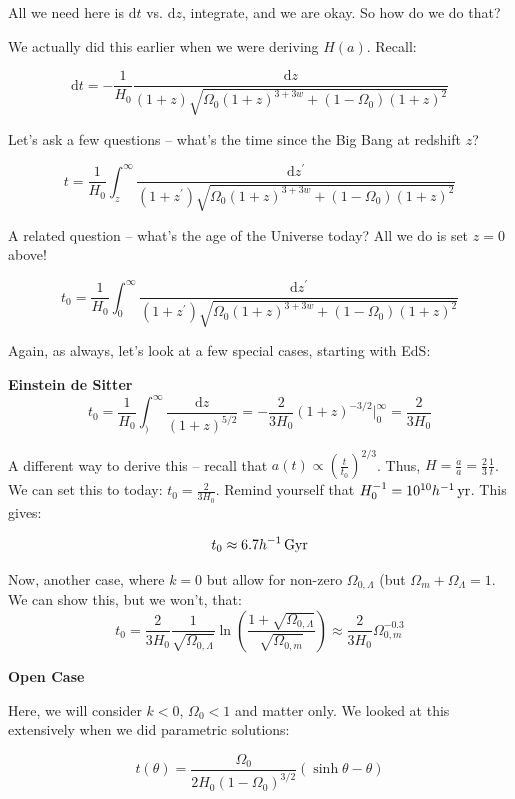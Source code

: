 \documentclass{article}
\newcommand{\unit}[1]{{\,\rm #1}}
\newcommand{\be}{\begin{equation}}
\newcommand{\ee}{\end{equation}}
\newcommand{\Gyr}{\unit{Gyr}}
\newcommand{\yr}{\unit{yr}}
\begin{document}
All we need here is $\mathrm{d}t$ vs. $\mathrm{d}z$, integrate, and we are okay. So how do we do that?

We actually did this earlier when we were deriving $H(a)$. Recall:

\be
\mathrm{d}t = -\frac{1}{H_0} \frac{\mathrm{d}z}{\left(1+z\right) \sqrt{\Omega_0 \left(1+z\right)^{3+3w} + (1-\Omega_0)\left(1+z\right)^2}}
\ee

Let's ask a few questions -- what's the time since the Big Bang at redshift $z$?

\be
t = \frac{1}{H_0}\int_{z}^{\infty} \frac{\mathrm{d}z^\prime}{\left(1+z^\prime\right)\sqrt{\Omega_0 \left(1+z\right)^{3+3w} + (1-\Omega_0)\left(1+z\right)^2}}
\ee

A related question -- what's the age of the Universe today? All we do is set $z = 0$ above! 

\be
t_0 = \frac{1}{H_0}\int_{0}^{\infty} \frac{\mathrm{d}z^\prime}{\left(1+z^\prime\right)\sqrt{\Omega_0 \left(1+z\right)^{3+3w} + (1-\Omega_0)\left(1+z\right)^2}}
\ee

Again, as always, let's look at a few special cases, starting with EdS:

\noindent\textbf{Einstein de Sitter}
\be
t_0 = \frac{1}{H_0} \int_)^\infty \frac{\mathrm{d}z}{(1+z)^{5/2}} = -\frac{2}{3H_0} \left(1+z\right)^{-3/2}\rvert_{0}^{\infty} =\frac{2}{3H_0}
\ee

A different way to derive this -- recall that $a(t) \propto \left(\frac{t}{t_0}\right)^{2/3}$. Thus, $H = \frac{\dot{a}}{a} = \frac23 \frac{1}{t}$. We can set this to today: $t_0 = \frac{2}{3H_0}$. Remind yourself that $H_0^{-1} = 10^{10} h^{-1} \yr$. This gives:

\be
t_0 \approx 6.7 h^{-1} \Gyr
\ee

Now, another case, where $k=0$ but allow for non-zero $\Omega_{0,\Lambda}$ (but $\Omega_m + \Omega_\Lambda = 1$. We can show this, but we won't, that:\\

\be
t_0 = \frac{2}{3H_0}\frac{1}{\sqrt{\Omega_{0,\Lambda}}}\ln \left(\frac{1 + \sqrt{\Omega_{0,\Lambda}}}{\sqrt{\Omega_{0,m}}}\right) \approx \frac{2}{3H_0}\Omega_{0,m}^{-0.3}
\ee


\noindent\textbf{Open Case}

Here, we will consider $k<0$, $\Omega_0<1$ and matter only. We looked at this extensively when we did parametric solutions:

\be
t(\theta) = \frac{\Omega_0}{2H_0\left(1-\Omega_0\right)^{3/2}}\left(\sinh\theta - \theta\right)
\ee
\end{document}

